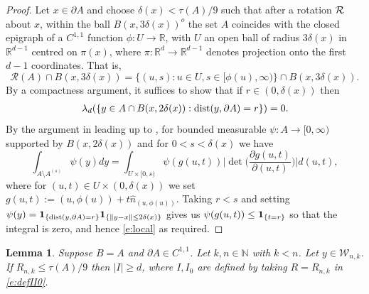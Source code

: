 \documentclass[12pt]{article}
\newcommand{\N}{\mathbb{N}}
\newcommand{\cX}{\mathcal{X}}
\newcommand{\cW}{\mathcal{W}}
\newcommand{\R}{\mathbb{R}}
\newcommand{\dist}{{\rm dist}}
\newtheorem{lemm}{Lemma}
\begin{document}
\begin{proof}
	Let $x \in \partial A$ and 
	choose $\delta (x) < \tau(A)/9$ such that after a rotation 
	$\cal R$ about $x$, within the ball
	$B(x,3 \delta(x))^o$ the set $A$ coincides with the closed epigraph of a $C^{1,1}$ function $\phi:U \to \R$, with $U$ an open ball of radius 
	$3 \delta(x)$ in $\R^{d-1}$ centred on $\pi(x)$, where $\pi: \R^d \to \R^{d-1}$ denotes projection onto the first $d-1$ coordinates. That is,
	$$
	\mathcal R(A) \cap B(x,3 \delta(x)) =
	\{(u,s): u \in U, s \in [\phi(u), \infty) \} \cap B(x,3 \delta(x)).
	$$
	By a compactness argument, it suffices to show that 
	if $r \in (0,\delta (x))$ then
	\begin{align}
	\lambda_d(\{y \in A \cap B(x,2\delta(x)): \dist(y,\partial A ) = r\})
	=0.
		\label{e:local}
		\end{align}
	By the argument in \cite{HPY} leading up to \cite[eqn (3.12)]{HPY},
	for bounded measurable $\psi:A \to [0,\infty)$
	supported  by $B(x,2\delta(x))$ and for $0 < s < \delta(x)$ we have
	$$
	\int_{A \setminus A^{(s)}} \psi(y) dy
	= \int_{U \times[0,s)} \psi(g(u,t))
	\Big| \det \Big( \frac{\partial g(u,t)}{\partial (u,t)} \Big) \Big|
	d(u,t),
	$$
	where for $(u,t) \in U \times (0,\delta(x))$ we set 
	$g(u,t):= (u, \phi(u)) + t \hat{n}_{(u,\phi(u))}.$ 
	Taking $r < s$ and
	setting $\psi(y) = {\bf 1}_{\{\dist(y,\partial A) =r\}}
	{\bf 1}_{\{\|y-x\|\leq 2 \delta(x)\}}$ 
	gives us $\psi(g(u,t)) \leq {\bf 1}_{\{t =r\}}$
	so that the integral is zero, and hence \eqref{e:local}
	as required.
\end{proof}
\begin{lemm}
	\label{l:I>=d}
	Suppose $B=A$ and $\partial A \in C^{1,1}$. Let $k,n \in \N$ with
	$k < n$. Let $y \in \cW_{n,k}$.
	If $R_{n,k} \leq \tau(A)/9$ then $|I| \geq d$, where
	$I,I_0$ are defined by taking $R= R_{n,k}$ in \eqref{e:defII0}.
\end{lemm}
\end{document}
